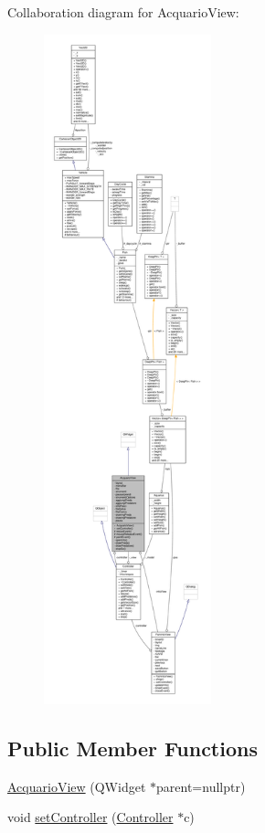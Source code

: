 Collaboration diagram for Acquario\+View\+:\nopagebreak
\begin{figure}[H]
\begin{center}
\leavevmode
\includegraphics[height=550pt]{classAcquarioView__coll__graph}
\end{center}
\end{figure}
\subsection*{Public Member Functions}
\begin{DoxyCompactItemize}
\item 
\hyperlink{classAcquarioView_a5ac370a34350600cef09645040a3d6a0_a5ac370a34350600cef09645040a3d6a0}{Acquario\+View} (Q\+Widget $\ast$parent=nullptr)
\item 
void \hyperlink{classAcquarioView_a51cd9c97070c369e78cc8aa2c469f32f_a51cd9c97070c369e78cc8aa2c469f32f}{set\+Controller} (\hyperlink{classController}{Controller} $\ast$c)
\end{DoxyCompactItemize}
